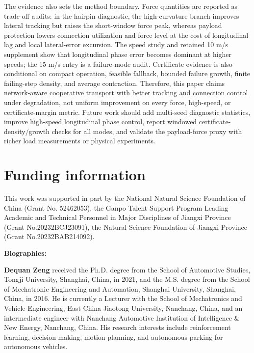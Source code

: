 \documentclass[twocolumn,3p,times,procedia]{elsarticle}
\begin{document}
The evidence also sets the method boundary. Force quantities are reported as trade-off audits: in the hairpin diagnostic, the high-curvature branch improves lateral tracking but raises the short-window force peak, whereas payload protection lowers connection utilization and force level at the cost of longitudinal lag and local lateral-error excursion. The speed study and retained 10 m/s supplement show that longitudinal phase error becomes dominant at higher speeds; the 15 m/s entry is a failure-mode audit. Certificate evidence is also conditional on compact operation, feasible fallback, bounded failure growth, finite failing-step density, and average contraction. Therefore, this paper claims network-aware cooperative transport with better tracking and connection control under degradation, not uniform improvement on every force, high-speed, or certificate-margin metric. Future work should add multi-seed diagnostic statistics, improve high-speed longitudinal phase control, report windowed certificate-density/growth checks for all modes, and validate the payload-force proxy with richer load measurements or physical experiments.

\section*{Funding information}
This work was supported in part by the National Natural Science Foundation of China (Grant No. 52462053), the Ganpo Talent Support Program Leading Academic and Technical Personnel in Major Disciplines of Jiangxi Province (Grant No.20232BCJ23091), the Natural Science Foundation of Jiangxi Province (Grant No.20232BAB214092).

\FloatBarrier
\begingroup
\fontsize{7}{7}\selectfont
\setlength{\bibsep}{0pt plus 0.1ex}


\endgroup

\noindent\textbf{Biographies:}
\par\vspace{0.15ex}

\noindent\textbf{Dequan Zeng} received the Ph.D. degree from the School of Automotive Studies, Tongji University, Shanghai, China, in 2021, and the M.S. degree from the School of Mechatronic Engineering and Automation, Shanghai University, Shanghai, China, in 2016. He is currently a Lecturer with the School of Mechatronics and Vehicle Engineering, East China Jiaotong University, Nanchang, China, and an intermediate engineer with Nanchang Automotive Institution of Intelligence \& New Energy, Nanchang, China. His research interests include reinforcement learning, decision making, motion planning, and autonomous parking for autonomous vehicles.
\end{document}
